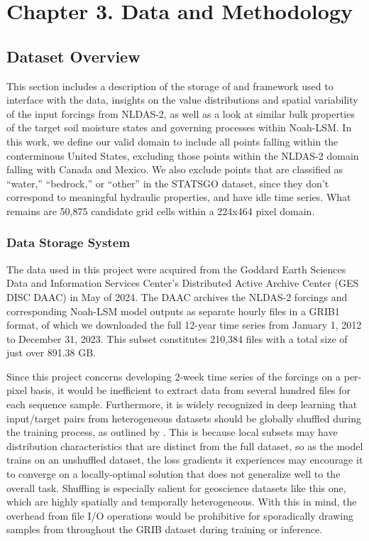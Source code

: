 \chapter{Chapter 3. Data and Methodology}

\section{Dataset Overview}

This section includes a description of the storage of and framework used to interface with the data, insights on the value distributions and spatial variability of the input forcings from NLDAS-2, as well as a look at similar bulk properties of the target soil moisture states and governing processes within Noah-LSM. In this work, we define our valid domain to include all points falling within the conterminous United States, excluding those points within the NLDAS-2 domain falling with Canada and Mexico. We also exclude points that are classified as ``water,'' ``bedrock,'' or ``other'' in the STATSGO dataset, since they don't correspond to meaningful hydraulic properties, and have idle time series. What remains are 50,875 candidate grid cells within a 224x464 pixel domain.

\subsection{Data Storage System}

The data used in this project were acquired from the Goddard Earth Sciences Data and Information Services Center's Distributed Active Archive Center (GES DISC DAAC) in May of 2024. The DAAC archives the NLDAS-2 forcings and corresponding Noah-LSM model outputs as separate hourly files in a GRIB1 format, of which we downloaded the full 12-year time series from January 1, 2012 to December 31, 2023. This subset constitutes 210,384 files with a total size of just over 891.38 GB.

Since this project concerns developing 2-week time series of the forcings on a per-pixel basis, it would be inefficient to extract data from several hundred files for each sequence sample. Furthermore, it is widely recognized in deep learning that input/target pairs from heterogeneous datasets should be globally shuffled during the training process, as outlined by \citep{nguyen_why_2022}. This is because local subsets may have distribution characteristics that are distinct from the full dataset, so as the model trains on an unshuffled dataset, the loss gradients it experiences may encourage it to converge on a locally-optimal solution that does not generalize well to the overall task. Shuffling is especially salient for geoscience datasets like this one, which are highly spatially and temporally heterogeneous. With this in mind, the overhead from file I/O operations would be prohibitive for sporadically drawing samples from throughout the GRIB dataset during training or inference.

